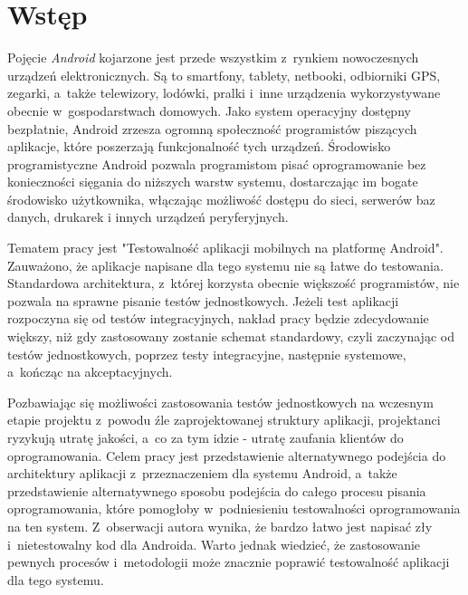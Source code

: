 \chapter{Wstęp}
\label{wstep}

Pojęcie \textit{Android} kojarzone jest przede wszystkim z~rynkiem nowoczesnych urządzeń elektronicznych. Są to smartfony, tablety, netbooki, odbiorniki GPS, zegarki, a~także telewizory, lodówki, pralki i~inne urządzenia wykorzystywane obecnie w~gospodarstwach domowych. Jako system operacyjny dostępny bezpłatnie, Android zrzesza ogromną społeczność programistów piszących aplikacje, które poszerzają funkcjonalność tych urządzeń. Środowisko programistyczne Android pozwala programistom pisać oprogramowanie bez konieczności sięgania do niższych warstw systemu, dostarczając im bogate środowisko użytkownika, włączając możliwość dostępu do sieci, serwerów baz danych, drukarek i innych urządzeń peryferyjnych. 

Tematem pracy jest "Testowalność aplikacji mobilnych na platformę Android". Zauważono, że aplikacje napisane dla tego systemu nie są łatwe do testowania. Standardowa architektura, z~której korzysta obecnie większość programistów, nie pozwala na sprawne pisanie testów jednostkowych. Jeżeli test aplikacji rozpoczyna się od testów integracyjnych, nakład pracy będzie zdecydowanie większy, niż gdy zastosowany zostanie schemat standardowy, czyli zaczynając od testów jednostkowych, poprzez testy integracyjne, następnie systemowe, a~kończąc na akceptacyjnych. 

Pozbawiając się możliwości zastosowania testów jednostkowych na wczesnym etapie projektu z~powodu źle zaprojektowanej struktury aplikacji, projektanci ryzykują utratę jakości, a~co za tym idzie - utratę zaufania klientów do oprogramowania. Celem pracy jest przedstawienie alternatywnego podejścia do architektury aplikacji z~przeznaczeniem dla systemu Android, a~także przedstawienie alternatywnego sposobu podejścia do całego procesu pisania oprogramowania, które pomogłoby w~podniesieniu testowalności oprogramowania na ten system. Z~obserwacji autora wynika, że bardzo łatwo jest napisać zły i~nietestowalny kod dla Androida. Warto jednak wiedzieć, że zastosowanie pewnych procesów i~metodologii może znacznie poprawić testowalność aplikacji dla tego systemu. 

